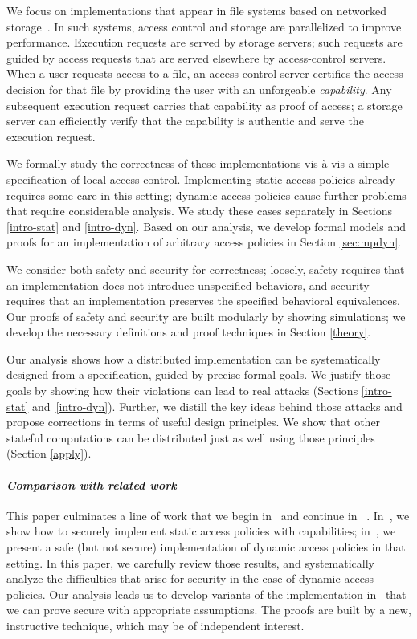 \documentclass[10pt]{article}
\begin{document}
We focus on implementations that appear in file systems based on networked storage~\cite{gobioff-security}. In such systems, access control and storage are parallelized to improve performance. Execution requests are served by storage servers; such requests are guided by access requests that are served elsewhere by access-control servers. When a user requests access to a file, an access-control server certifies the access decision for that file by providing the user with an unforgeable \emph{capability}. Any subsequent execution request carries that capability as proof of access; a storage server can efficiently verify that the capability is authentic and serve the execution request.

We formally study the correctness of these implementations vis-\`a-vis a simple specification of local access control. Implementing static access policies already requires some care in this setting; dynamic access policies cause further problems that require considerable analysis. We study these cases separately in Sections \ref{intro-stat} and \ref{intro-dyn}. Based on our analysis, we develop formal models and proofs for an implementation of arbitrary access policies in Section \ref{sec:mpdyn}. 




We consider both safety and security for correctness; loosely, safety requires that an implementation does not introduce unspecified behaviors, and security requires that an implementation preserves the specified behavioral equivalences. 
Our proofs of safety and security are built modularly by showing simulations; we develop the necessary definitions and proof techniques in Section \ref{theory}.

Our analysis shows how a distributed implementation can be systematically designed from a specification, guided by precise formal goals. We justify those goals by showing how their violations can lead to real attacks  (Sections \ref{intro-stat} and~\ref{intro-dyn}). Further, we distill the key ideas behind those attacks and propose corrections in terms of useful design principles. We show that other stateful computations can be distributed just as well using those principles (Section \ref{apply}).



\paragraph{\em Comparison with related work} This paper culminates a line of work that we begin in~\cite{ChaudhuriAbadi-FMSE05} and continue in ~\cite{ForteChaudhuriA06}. In~\cite{ChaudhuriAbadi-FMSE05}, we show how to securely implement static access policies with capabilities; in~\cite{ForteChaudhuriA06}, we present a safe (but not secure) implementation of dynamic access policies in that setting. In this paper, we carefully review those results, and systematically analyze the difficulties that arise for security in the case of dynamic access policies. Our analysis leads us to develop variants of the implementation in~\cite{ForteChaudhuriA06} that we can prove secure with appropriate assumptions. The proofs are built by a new, instructive technique, which may be of independent interest. 
\end{document}
